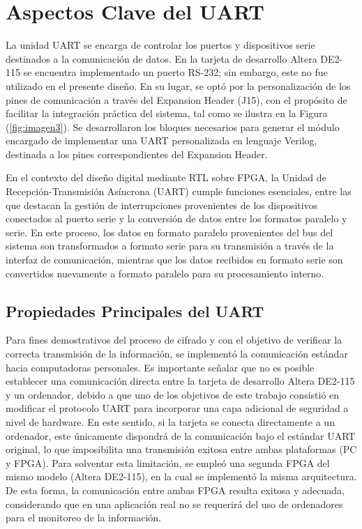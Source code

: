 \clearpage

\section{Aspectos Clave del UART}

La unidad UART se encarga de controlar los puertos y dispositivos serie destinados a la comunicación de datos. En la tarjeta de desarrollo Altera DE2-115 se encuentra implementado un puerto RS-232; sin embargo, este no fue utilizado en el presente diseño. En su lugar, se optó por la personalización de los pines de comunicación a través del Expansion Header (J15), con el propósito de facilitar la integración práctica del sistema, tal como se ilustra en la Figura (\ref{fig:imagen3}). Se desarrollaron los bloques necesarios para generar el módulo encargado de implementar una UART personalizada en lenguaje Verilog, destinada a los pines correspondientes del Expansion Header.

En el contexto del diseño digital mediante RTL sobre FPGA, la Unidad de Recepción-Transmisión Asíncrona (UART) cumple funciones esenciales, entre las que destacan la gestión de interrupciones provenientes de los dispositivos conectados al puerto serie y la conversión de datos entre los formatos paralelo y serie. En este proceso, los datos en formato paralelo provenientes del bus del sistema son transformados a formato serie para su transmisión a través de la interfaz de comunicación, mientras que los datos recibidos en formato serie son convertidos nuevamente a formato paralelo para su procesamiento interno.

\subsection{Propiedades Principales del UART}

Para fines demostrativos del proceso de cifrado y con el objetivo de verificar la correcta transmisión de la información, se implementó la comunicación estándar hacia computadoras personales. Es importante señalar que no es posible establecer una comunicación directa entre la tarjeta de desarrollo Altera DE2-115 y un ordenador, debido a que uno de los objetivos de este trabajo consistió en modificar el protocolo UART para incorporar una capa adicional de seguridad a nivel de hardware. En este sentido, si la tarjeta se conecta directamente a un ordenador, este únicamente dispondrá de la comunicación bajo el estándar UART original, lo que imposibilita una transmisión exitosa entre ambas plataformas (PC y FPGA). Para solventar esta limitación, se empleó una segunda FPGA del mismo modelo (Altera DE2-115), en la cual se implementó la misma arquitectura. De esta forma, la comunicación entre ambas FPGA resulta exitosa y adecuada, considerando que en una aplicación real no se requerirá del uso de ordenadores para el monitoreo de la información.


